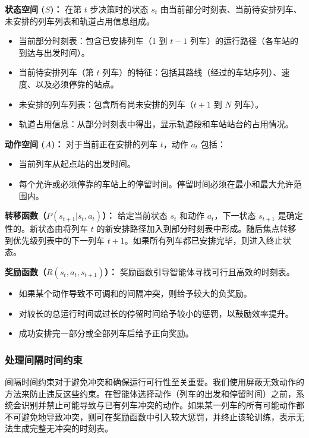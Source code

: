 \documentclass{article}
\begin{document}
    \textbf{状态空间 ($S$)：}
    在第 $t$ 步决策时的状态 $s_t$ 由当前部分时刻表、当前待安排列车、未安排的列车列表和轨道占用信息组成。
    \begin{itemize}
        \item 当前部分时刻表：包含已安排列车（1 到 $t-1$ 列车）的运行路径（各车站的到达与出发时间）。
        \item 当前待安排列车（第 $t$ 列车）的特征：包括其路线（经过的车站序列）、速度、以及必须停靠的站点。
        \item 未安排的列车列表：包含所有尚未安排的列车（$t+1$ 到 $N$ 列车）。
        \item 轨道占用信息：从部分时刻表中得出，显示轨道段和车站站台的占用情况。
    \end{itemize}

    \textbf{动作空间 ($A$)：}
    对于当前正在安排的列车 $t$，动作 $a_t$ 包括：
    \begin{itemize}
        \item 当前列车从起点站的出发时间。
        \item 每个允许或必须停靠的车站上的停留时间。停留时间必须在最小和最大允许范围内。
    \end{itemize}

    \textbf{转移函数（$P(s_{t+1} | s_t, a_t)$）：}
    给定当前状态 $s_t$ 和动作 $a_t$，下一状态 $s_{t+1}$ 是确定性的。新状态由将列车 $t$
    的新安排路径加入到部分时刻表中形成。随后焦点转移到优先级列表中的下一列车 $t+1$。如果所有列车都已安排完毕，则进入终止状态。

    \textbf{奖励函数（$R(s_t, a_t, s_{t+1})$）：}
    奖励函数引导智能体寻找可行且高效的时刻表。
    \begin{itemize}
        \item 如果某个动作导致不可调和的间隔冲突，则给予较大的负奖励。
        \item 对较长的总运行时间或过长的停留时间给予较小的惩罚，以鼓励效率提升。
        \item 成功安排完一部分或全部列车后给予正向奖励。
    \end{itemize}

    \subsubsection{处理间隔时间约束}
    间隔时间约束对于避免冲突和确保运行可行性至关重要。我们使用屏蔽无效动作的方法来防止违反这些约束。在智能体选择动作（列车的出发和停留时间）之前，系统会识别并禁止可能导致与已有列车冲突的动作。如果某一列车的所有可能动作都不可避免地导致冲突，则可在奖励函数中引入较大惩罚，并终止该轮训练，表示无法生成完整无冲突的时刻表。
\end{document}
